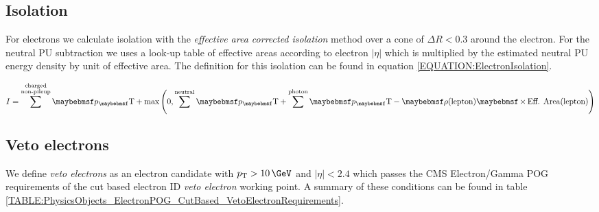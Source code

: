 \subsection{Isolation}
\label{SUBSECTION:EventReconstructionAndSimulation_LeptonIsolation_Isolation}



For electrons we calculate isolation with the \textit{effective area corrected isolation} method over a cone of $\Delta R<0.3$ around the electron. For the neutral \gls{PU} subtraction we uses a look-up table of effective areas according to electron $|\eta|$ which is multiplied by the estimated neutral \gls{PU} energy density by unit of effective area. The definition for this isolation can be found in equation \ref{EQUATION:ElectronIsolation}.

\begin{equation}
I = \sum^{\substack{\text{charged} \\ \text{non-pileup}}}\pT +
\text{max}\left(0,\sum^{\text{neutral}}\pT+\sum^{\text{photon}}\pT - \rho(\text{lepton}) \times \text{Eff. Area}(\text{lepton})\right)
\label{EQUATION:ElectronIsolation}
\end{equation}

\subsection{Veto electrons}


We define \textit{veto electrons} as an electron candidate with $\pt>10\,\GeV$ and $|\eta|<2.4$ which passes the \gls{CMS} Electron/Gamma \gls{POG}~\cite{ARTICLE:CMSElectronReconstruction7TeV} requirements of the cut based electron \gls{ID} \textit{veto electron} working point. A summary of these conditions can be found in table \ref{TABLE:PhysicsObjects_ElectronPOG_CutBased_VetoElectronRequirements}.
 


